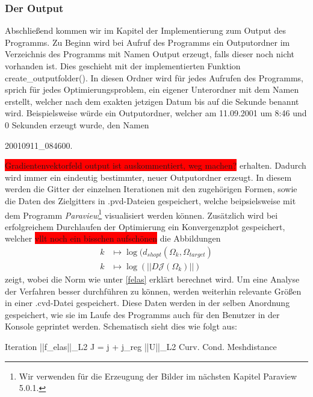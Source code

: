 \subsubsection{Der Output}
Abschließend kommen wir im Kapitel der Implementierung zum Output des Programms.
Zu Beginn wird bei Aufruf des Programms ein Outputordner im Verzeichnis des Programms mit Namen \textsf{Output} erzeugt, falls dieser noch nicht vorhanden ist. Dies geschieht mit der implementierten Funktion \textsf{create\_outputfolder()}. In diesen Ordner wird für jedes Aufrufen des Programms, sprich für jedes Optimierungsproblem, ein eigener Unterordner mit dem Namen erstellt, welcher nach dem exakten jetzigen Datum bis auf die Sekunde benannt wird. Beispielsweise würde ein Outputordner, welcher am 11.09.2001 um 8:46 und 0 Sekunden erzeugt wurde, den Namen 
\begin{center}
\textsf{20010911\_084600}.
\end{center}
\colorbox{red}{Gradientenvektorfeld output ist auskommentiert, weg machen?}
erhalten. Dadurch wird immer ein eindeutig bestimmter, neuer Outputordner erzeugt. In diesem werden die Gitter der einzelnen Iterationen mit den zugehörigen Formen, sowie die Daten des Zielgitters in \textsf{.pvd}-Dateien gespeichert, welche beipsielsweise mit dem Programm \textit{Paraview}\footnote{Wir verwenden für die Erzeugung der Bilder im nächsten Kapitel Paraview 5.0.1.} visualisiert werden können. Zusätzlich wird bei erfolgreichem Durchlaufen der Optimierung ein Konvergenzplot gespeichert, welcher \colorbox{red}{vllt noch ein bisschen aufschönen} die Abbildungen
\begin{align*}
k &\mapsto \log(d_{shopt}(\Omega_k, \Omega_{target}) \\
k &\mapsto \log(\vert\vert D\mathcal{J}(\Omega_k) \vert\vert)
\end{align*}
zeigt, wobei die Norm wie unter \ref{felas} erklärt berechnet wird. Um eine Analyse der Verfahren besser durchführen zu können, werden weiterhin relevante Größen in einer \textsf{.cvd}-Datei gespeichert. Diese Daten werden in der selben Anordnung gespeichert, wie sie im Laufe des Programms auch für den Benutzer in der Konsole geprintet werden. Schematisch sieht dies wie folgt aus:
\begin{center}
\textsf{Iteration \hspace{0.1cm}  ||f\_elas||\_L2 \hspace{0.1cm}  J = j + j\_reg   \hspace{0.1cm} ||U||\_L2 \hspace{0.1cm}  Curv. Cond. \hspace{0.1cm} Meshdistance}
\end{center}

